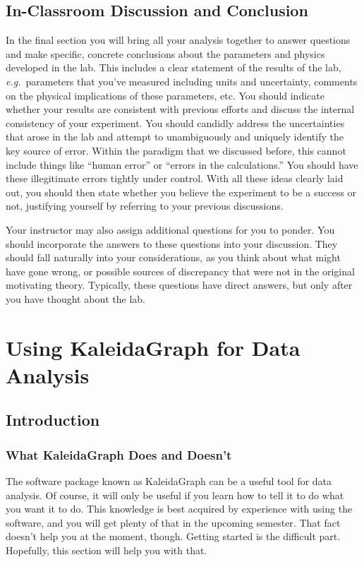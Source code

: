 \subsection{In-Classroom Discussion and Conclusion}
In the final section you will bring all your analysis 
together to answer questions and make 
specific, concrete conclusions about the parameters and physics developed in 
the lab. This includes a clear statement of the results of the lab, 
{\it e.g.}~parameters that you've measured including units and uncertainty, 
comments on the physical implications of these parameters, etc. You should 
indicate whether your results are consistent with previous efforts and discuss 
the internal consistency of your experiment. You should candidly address the 
uncertainties that arose in the lab and attempt to unambiguously and uniquely 
identify the key source of error. Within the paradigm that we discussed before,
this cannot include things like ``human error'' or ``errors in the 
calculations.'' You should have these illegitimate errors tightly under 
control. With all these ideas clearly laid out, you should then state whether 
you believe the experiment to be a success or not, justifying yourself by 
referring to your previous discussions.

Your instructor may also assign additional questions for you to ponder. You 
should incorporate the answers to these questions into your discussion. They 
should fall naturally into your considerations, as you think about what might 
have gone wrong, or possible sources of discrepancy that were not in the 
original motivating theory. Typically, these questions have direct answers, 
but only after you have thought about the lab. 

\section{Using KaleidaGraph for Data Analysis}
\label{sec:hypoexp}
\subsection{Introduction}
\subsubsection{What KaleidaGraph Does and Doesn't}

The software package known as KaleidaGraph can be a useful tool for
data analysis. Of course, it will only be useful if you learn how to
tell it to do what you want it to do. This knowledge is best acquired
by experience with using the software, and you will get plenty of that
in the upcoming semester. That fact doesn't help you at the moment,
though. Getting started is the difficult part.  Hopefully, this
section will help you with that.

